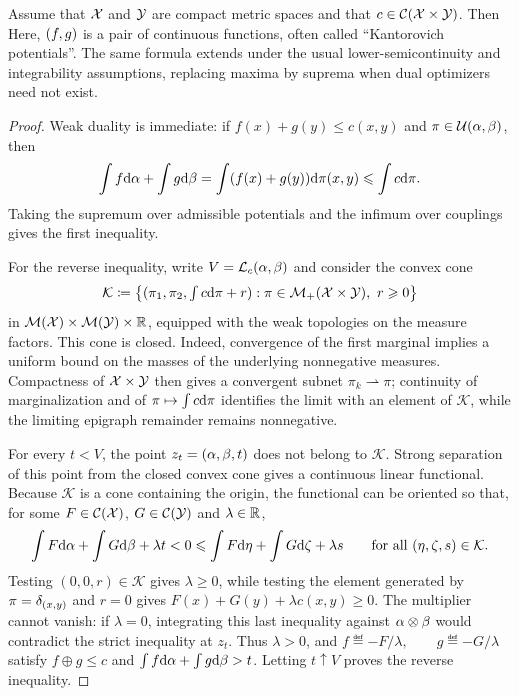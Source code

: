 \begin{prop}\label{prop-kantorovich-duality-general}
	Assume that $\mathcal{X}$ and $\mathcal{Y}$ are compact metric spaces and that $c\in\mathcal{C}(\mathcal{X}\times\mathcal{Y})$. Then
	Here, $(f,g)$ is a pair of continuous functions, often called ``Kantorovich potentials''.
	The same formula extends under the usual lower-semicontinuity and integrability assumptions, replacing maxima by suprema when dual optimizers need not exist.
\end{prop}
\begin{proof}
	Weak duality is immediate: if $f(x)+g(y)\leq c(x,y)$ and $\pi\in\mathcal{U}(\alpha,\beta)$, then
	\[
		\int f\mathrm{d}\alpha+\int g\mathrm{d}\beta
		=
		\int (f(x)+g(y))\mathrm{d}\pi(x,y)
		\leqslant
		\int c\mathrm{d}\pi.
	\]
	Taking the supremum over admissible potentials and the infimum over couplings gives the first inequality.

	For the reverse inequality, write $V=\mathcal{L}_c(\alpha,\beta)$ and consider the convex cone
	\[
		\mathcal K
		\coloneqq
		\bigl\{(\pi_1,\pi_2,\textstyle\int c\mathrm{d}\pi+r):
		\pi\in\mathcal{M}_+(\mathcal{X}\times\mathcal{Y}),\ r\geqslant0\bigr\}
	\]
	in $\mathcal{M}(\mathcal{X})\times\mathcal{M}(\mathcal{Y})\times\mathbb{R}$, equipped with the weak topologies on the measure factors. This cone is closed. Indeed, convergence of the first marginal implies a uniform bound on the masses of the underlying nonnegative measures. Compactness of $\mathcal{X}\times\mathcal{Y}$ then gives a convergent subnet $\pi_k\rightharpoonup\pi$; continuity of marginalization and of $\pi\mapsto\int c\mathrm{d}\pi$ identifies the limit with an element of $\mathcal K$, while the limiting epigraph remainder remains nonnegative.

	For every $t<V$, the point $z_t=(\alpha,\beta,t)$ does not belong to $\mathcal K$. Strong separation of this point from the closed convex cone gives a continuous linear functional. Because $\mathcal K$ is a cone containing the origin, the functional can be oriented so that, for some $F\in\mathcal{C}(\mathcal{X})$, $G\in\mathcal{C}(\mathcal{Y})$ and $\lambda\in\mathbb{R}$,
	\[
		\int F\mathrm{d}\alpha+\int G\mathrm{d}\beta+\lambda t<0
		\leqslant
		\int F\mathrm{d}\eta+\int G\mathrm{d}\zeta+\lambda s
		\qquad
		\text{for all }(\eta,\zeta,s)\in\mathcal K.
	\]
	Testing $(0,0,r)\in\mathcal K$ gives $\lambda\geq0$, while testing the element generated by $\pi=\delta_{(x,y)}$ and $r=0$ gives
	$F(x)+G(y)+\lambda c(x,y)\geq0$. The multiplier cannot vanish: if $\lambda=0$, integrating this last inequality against $\alpha\otimes\beta$ would contradict the strict inequality at $z_t$. Thus $\lambda>0$, and
	\(f\eqdef-F/\lambda,\qquad g\eqdef-G/\lambda\)
	satisfy $f\oplus g\leq c$ and
	$\int f\mathrm{d}\alpha+\int g\mathrm{d}\beta>t$. Letting $t\uparrow V$ proves the reverse inequality.


\end{proof}
